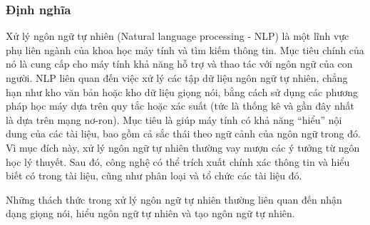 \subsubsection{Định nghĩa}
Xử lý ngôn ngữ tự nhiên (Natural language processing - NLP) là một lĩnh vực phụ liên ngành của khoa học máy tính và tìm kiếm thông tin. Mục tiêu chính của nó là cung cấp cho máy tính khả năng hỗ trợ và thao tác với ngôn ngữ của con người. NLP liên quan đến việc xử lý các tập dữ liệu ngôn ngữ tự nhiên, chẳng hạn như kho văn bản hoặc kho dữ liệu giọng nói, bằng cách sử dụng các phương pháp học máy dựa trên quy tắc hoặc xác suất (tức là thống kê và gần đây nhất là dựa trên mạng nơ-ron). Mục tiêu là giúp máy tính có khả năng ``hiểu'' nội dung của các tài liệu, bao gồm cả sắc thái theo ngữ cảnh của ngôn ngữ trong đó. Vì mục đích này, xử lý ngôn ngữ tự nhiên thường vay mượn các ý tưởng từ ngôn học lý thuyết. Sau đó, công nghệ có thể trích xuất chính xác thông tin và hiểu biết có trong tài liệu, cũng như phân loại và tổ chức các tài liệu đó.

Những thách thức trong xử lý ngôn ngữ tự nhiên thường liên quan đến nhận dạng giọng nói, hiểu ngôn ngữ tự nhiên và tạo ngôn ngữ tự nhiên.

